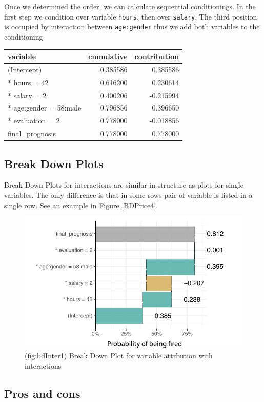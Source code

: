 \documentclass[]{krantz}
\theoremstyle{definition}
\theoremstyle{definition}
\theoremstyle{definition}
\theoremstyle{remark}
\begin{document}
Once we determined the order, we can calculate sequential conditionings.
In the first step we condition over variable \texttt{hours}, then over
\texttt{salary}. The third position is occupied by interaction between
\texttt{age:gender} thus we add both variables to the conditioning

\begin{longtable}[]{@{}lrr@{}}
\toprule
variable & cumulative & contribution\tabularnewline
\midrule
\endhead
(Intercept) & 0.385586 & 0.385586\tabularnewline
* hours = 42 & 0.616200 & 0.230614\tabularnewline
* salary = 2 & 0.400206 & -0.215994\tabularnewline
* age:gender = 58:male & 0.796856 & 0.396650\tabularnewline
* evaluation = 2 & 0.778000 & -0.018856\tabularnewline
final\_prognosis & 0.778000 & 0.778000\tabularnewline
\bottomrule
\end{longtable}

\hypertarget{break-down-plots-1}{%
\subsection{Break Down Plots}\label{break-down-plots-1}}

Break Down Plots for interactions are similar in structure as plots for
single variables. The only difference is that in some rows pair of
variable is listed in a single row. See an example in Figure
\ref{BDPrice4}.

\begin{figure}

{\centering \includegraphics[width=0.7\linewidth]{figure/bd_inter_1} 

}

\caption{(fig:bdInter1) Break Down Plot for variable attrbution with interactions }\label{fig:bdInter1}
\end{figure}

\hypertarget{pros-and-cons-2}{%
\subsection{Pros and cons}\label{pros-and-cons-2}}
\end{document}
